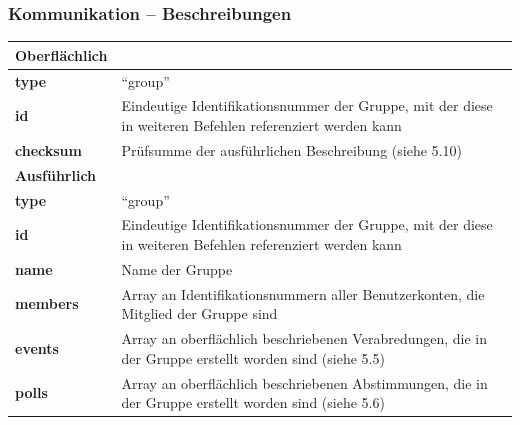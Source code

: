 \documentclass[aspectratio=1610]{beamer}
\begin{document}
    \begin{frame}[plain]
        \frametitle{\textbf{Kommunikation} -- Beschreibungen}
            \begin{tabular}[t]{ p{} p{} }
                \textbf{Oberflächlich}\\
                \hline
                \hfill\textbf{type} & \enquote{group}\\
                \hfill\textbf{id} & Eindeutige Identifikationsnummer der Gruppe{,} mit der diese in
                weiteren Befehlen referenziert werden kann\\
                \hfill\textbf{checksum} & Prüfsumme der ausführlichen
                Beschreibung (siehe 5.10)\\
                \hline\hline
                \textbf{Ausführlich}\\
                \hline
                \hfill\textbf{type} & \enquote{group}\\
                \hfill\textbf{id} & Eindeutige Identifikationsnummer der Gruppe{,} mit der diese in
            weiteren Befehlen referenziert werden kann\\
                \hfill\textbf{name} & Name der Gruppe\\
                \hfill\textbf{members} & Array an
                Identifikationsnummern aller Benutzerkonten, die Mitglied der
                Gruppe sind\\
                \hfill\textbf{events} & Array an oberflächlich
                beschriebenen Verabredungen, die in der Gruppe erstellt worden
                sind (siehe 5.5)\\
                \hfill\textbf{polls} & Array an oberflächlich
                beschriebenen Abstimmungen, die in der Gruppe erstellt worden
                sind (siehe 5.6)\\
            \end{tabular}
	\end{frame}
\end{document}
